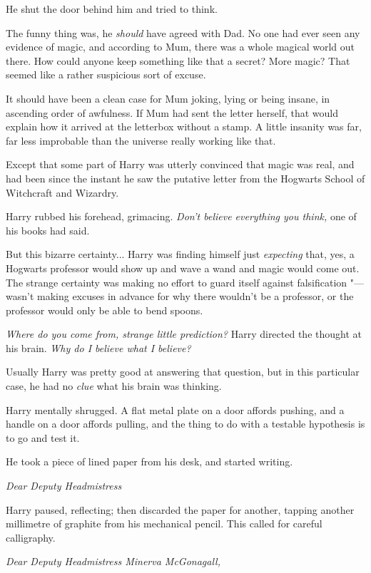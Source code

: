 He shut the door behind him and tried to think.

The funny thing was, he \emph{should} have agreed with Dad. No one had
ever seen any evidence of magic, and according to Mum, there was a whole
magical world out there. How could anyone keep something like that a
secret? More magic? That seemed like a rather suspicious sort of excuse.

It should have been a clean case for Mum joking, lying or being insane,
in ascending order of awfulness. If Mum had sent the letter herself,
that would explain how it arrived at the letterbox without a stamp. A
little insanity was far, far less improbable than the universe really
working like that.

Except that some part of Harry was utterly convinced that magic was
real, and had been since the instant he saw the putative letter from the
Hogwarts School of Witchcraft and Wizardry.

Harry rubbed his forehead, grimacing. \emph{Don't believe everything you
think,} one of his books had said.

But this bizarre certainty... Harry was finding himself just
\emph{expecting} that, yes, a Hogwarts professor would show up and wave
a wand and magic would come out. The strange certainty was making no
effort to guard itself against falsification "--- wasn't making excuses in
advance for why there wouldn't be a professor, or the professor would
only be able to bend spoons.

\emph{Where do you come from, strange little prediction?} Harry directed
the thought at his brain. \emph{Why do I believe what I believe?}

Usually Harry was pretty good at answering that question, but in this
particular case, he had no \emph{clue} what his brain was thinking.

Harry mentally shrugged. A flat metal plate on a door affords pushing,
and a handle on a door affords pulling, and the thing to do with a
testable hypothesis is to go and test it.

He took a piece of lined paper from his desk, and started writing.

\emph{Dear Deputy Headmistress}

Harry paused, reflecting; then discarded the paper for another, tapping
another millimetre of graphite from his mechanical pencil. This called
for careful calligraphy.

\emph{Dear Deputy Headmistress Minerva McGonagall,}


